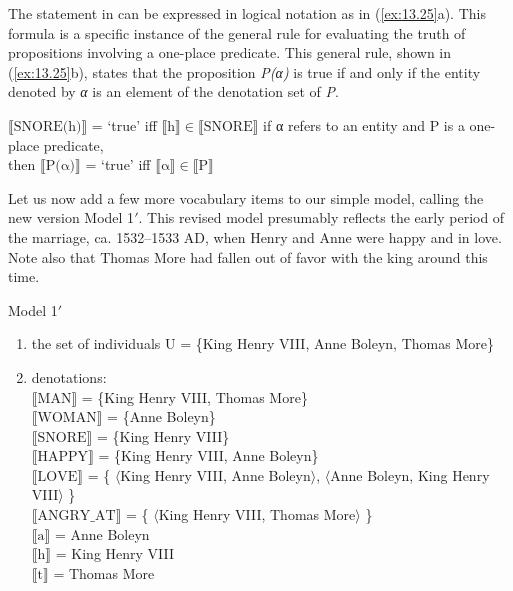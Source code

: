 The statement in  can be expressed in logical notation as in (\ref{ex:13.25}a). This formula is a specific instance of the general rule for evaluating the truth of propositions involving a one-place predicate. This general rule, shown in (\ref{ex:13.25}b), states that the proposition \textit{P(α)} is true if and only if the entity denoted by \textit{α} is an element of the denotation set of \textit{P}.

\ea \label{ex:13.25}
\ea  $\llbracket\text{SNORE(h)}\rrbracket$  = ‘true’  iff  $\llbracket\text{h}\rrbracket {\in} \llbracket\text{SNORE}\rrbracket$ 
\ex  if α refers to an entity and P is a one-place predicate,\\
  then  $\llbracket\text{P(α)}\rrbracket$  = ‘true’  iff  $\llbracket\text{α}\rrbracket {\in} \llbracket\text{P}\rrbracket$ 
\z \z


Let us now add a few more vocabulary items to our simple model, calling the new version Model 1$'$. This revised model presumably reflects the early period of the marriage, ca. 1532--1533 AD, when Henry and Anne were happy and in love. Note also that Thomas More had fallen out of favor with the king around this time.


\ea \label{ex:13.26} Model 1$'$\\
\begin{enumerate}[label=\roman*.]
\item the set of individuals U = \{King Henry VIII, Anne Boleyn, Thomas
More\}
\item denotations:\\
{}$\llbracket\text{MAN}\rrbracket$  = \{King Henry VIII, Thomas More\}\\[.6em]
$\llbracket\text{WOMAN}\rrbracket$  = \{Anne Boleyn\}\\[.6em]
$\llbracket\text{SNORE}\rrbracket$  = \{King Henry VIII\}\\[.6em]
$\llbracket\text{HAPPY}\rrbracket$  = \{King Henry VIII, Anne Boleyn\}\\[.6em]
$\llbracket\text{LOVE}\rrbracket$  = \{ $\langle$King Henry VIII, Anne Boleyn$\rangle$, $\langle$Anne Boleyn, King Henry VIII$\rangle$ \}\\[.6em]
$\llbracket\text{ANGRY\_AT}\rrbracket$  = \{ $\langle$King Henry VIII, Thomas More$\rangle$ \}\\[.6em]
$\llbracket\text{a}\rrbracket$  = Anne Boleyn\\[.6em]
$\llbracket\text{h}\rrbracket$  = King Henry VIII\\[.6em]
$\llbracket\text{t}\rrbracket$  = Thomas More
\end{enumerate}
\z

